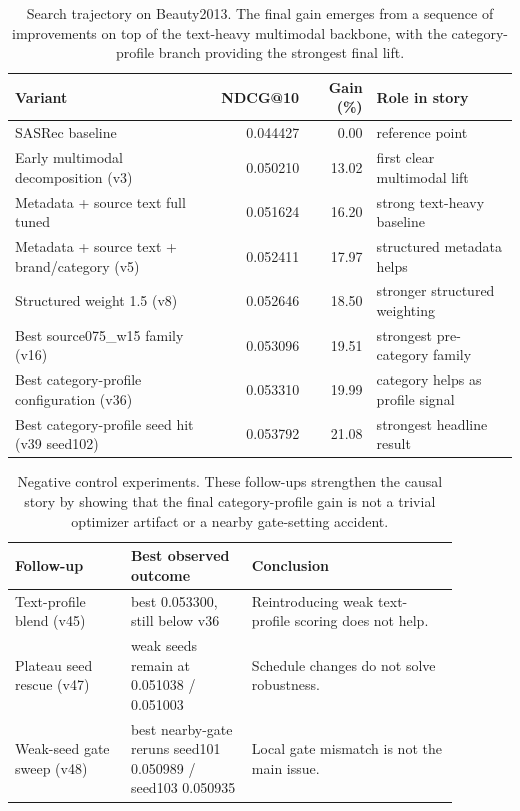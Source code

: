 \begin{table}[t]
\centering
\small
\begin{tabular}{lrrl}
\toprule
Variant & NDCG@10 & Gain (\%) & Role in story \\
\midrule
SASRec baseline & 0.044427 & 0.00 & reference point \\
Early multimodal decomposition (v3) & 0.050210 & 13.02 & first clear multimodal lift \\
Metadata + source text full tuned & 0.051624 & 16.20 & strong text-heavy baseline \\
Metadata + source text + brand/category (v5) & 0.052411 & 17.97 & structured metadata helps \\
Structured weight 1.5 (v8) & 0.052646 & 18.50 & stronger structured weighting \\
Best source075\_w15 family (v16) & 0.053096 & 19.51 & strongest pre-category family \\
Best category-profile configuration (v36) & 0.053310 & 19.99 & category helps as profile signal \\
Best category-profile seed hit (v39 seed102) & 0.053792 & 21.08 & strongest headline result \\
\bottomrule
\end{tabular}
\caption{Search trajectory on Beauty2013. The final gain emerges from a sequence of improvements on top of the text-heavy multimodal backbone, with the category-profile branch providing the strongest final lift.}
\label{tab:beauty2013_search_trajectory}
\end{table}

\begin{table}[t]
\centering
\small
\begin{tabular}{p{0.23\linewidth}p{0.24\linewidth}p{0.41\linewidth}}
\toprule
Follow-up & Best observed outcome & Conclusion \\
\midrule
Text-profile blend (v45) & best 0.053300, still below v36 & Reintroducing weak text-profile scoring does not help. \\
Plateau seed rescue (v47) & weak seeds remain at 0.051038 / 0.051003 & Schedule changes do not solve robustness. \\
Weak-seed gate sweep (v48) & best nearby-gate reruns seed101 0.050989 / seed103 0.050935 & Local gate mismatch is not the main issue. \\
\bottomrule
\end{tabular}
\caption{Negative control experiments. These follow-ups strengthen the causal story by showing that the final category-profile gain is not a trivial optimizer artifact or a nearby gate-setting accident.}
\label{tab:beauty2013_negative_controls}
\end{table}
